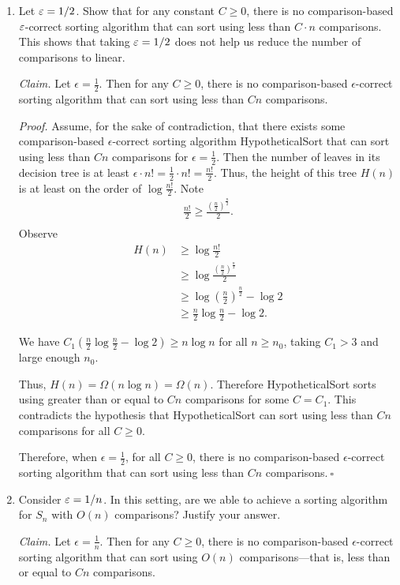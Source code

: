 \begin{enumerate}[resume]
    \item Let $\varepsilon=1/2$. Show that for any constant $C\geq 0$, there is no comparison-based $\varepsilon$-correct sorting algorithm that can sort using less than $C \cdot n$ comparisons. This shows that taking $\varepsilon=1/2$ does not help us reduce the number of comparisons to linear. 
\begin{solution}
\textit{Claim. }Let $\epsilon=\frac{1}{2}$. Then for any $C\geq 0$, there is no comparison-based $\epsilon$-correct sorting algorithm that can sort using less than $Cn$ comparisons.

\textit{Proof. }Assume, for the sake of contradiction, that there exists some comparison-based $\epsilon$-correct sorting algorithm {\sc HypotheticalSort} that can sort using less than $Cn$ comparisons for $\epsilon=\frac{1}{2}$. Then the number of leaves in its decision tree is at least $\epsilon\cdot n!=\frac{1}{2}\cdot n!=\frac{n!}{2}$. Thus, the height of this tree $H(n)$ is at least on the order of $\log{\frac{n!}{2}}$. Note
\begin{align*}
\frac{n!}{2}\geq\frac{\left(\frac{n}{2}\right)^{\frac{n}{2}}}{2}.\\
\end{align*}
Observe
\begin{align*}
H(n)&\geq\log\frac{n!}{2}\\
&\geq\log\frac{\left(\frac{n}{2}\right)^{\frac{n}{2}}}{2}\\
&\geq\log\left(\frac{n}{2}\right)^{\frac{n}{2}}-\log 2\\
&\geq\frac{n}{2}\log\frac{n}{2}-\log 2.
\end{align*}

We have $C_1\left(\frac{n}{2}\log\frac{n}{2}-\log 2\right)\geq n\log n$ for all $n\geq n_0$, taking $C_1>3$ and large enough $n_0$.

Thus, $H(n)=\Omega(n\log n)=\Omega(n)$. Therefore {\sc HypotheticalSort} sorts using greater than or equal to $Cn$ comparisons for some $C=C_1$. This contradicts the hypothesis that {\sc HypotheticalSort} can sort using less than $Cn$ comparisons for all $C\geq 0$.

Therefore, when $\epsilon=\frac{1}{2}$, for all $C\geq 0$, there is no comparison-based $\epsilon$-correct sorting algorithm that can sort using less than $Cn$ comparisons.$~\square$
\end{solution}

    \item Consider $\varepsilon=1/n$. In this setting, are we able to achieve a sorting algorithm for $S_n$ with $O(n)$ comparisons? Justify your answer.
\begin{solution}
\textit{Claim. }Let $\epsilon=\frac{1}{n}$. Then for any $C\geq 0$, there is no comparison-based $\epsilon$-correct sorting algorithm that can sort using $O(n)$ comparisons---that is, less than or equal to $Cn$ comparisons.


\end{solution}
\end{enumerate}
